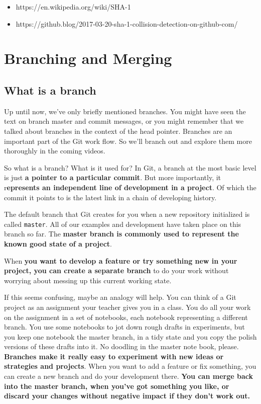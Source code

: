	\begin{itemize}
		\item 	https://en.wikipedia.org/wiki/SHA-1
		\item  	https://github.blog/2017-03-20-sha-1-collision-detection-on-github-com/
	\end{itemize}
	
\section{Branching and Merging}

	\subsection{What is a branch}
	
	Up until now, we've only briefly mentioned branches. You might have seen the text on branch master and commit messages, or you might remember that we talked about branches in the context of the head pointer. Branches are an important part of the Git work flow. So we'll branch out and explore them more thoroughly in the coming videos. 
	
	So what is a branch? What is it used for? In Git, a branch at the most basic level is just \textbf{a pointer to a particular commit}. But more importantly, it r\textbf{epresents an independent line of development in a project}. Of which the commit it points to is the latest link in a chain of developing history. 
	
	The default branch that Git creates for you when a new repository initialized is called \texttt{master}. All of our examples and development have taken place on this branch so far. The\textbf{ master branch is commonly used to represent the known good state of a project}. 
	
	When\textbf{ you want to develop a feature or try something new in your project, you can create a separate branch} to do your work without worrying about messing up this current working state. 
	
	If this seems confusing, maybe an analogy will help. You can think of a Git project as an assignment your teacher gives you in a class. You do all your work on the assignment in a set of notebooks, each notebook representing a different branch. You use some notebooks to jot down rough drafts in experiments, but you keep one notebook the master branch, in a tidy state and you copy the polish versions of these drafts into it. No doodling in the master note book, please. \textbf{Branches make it really easy to experiment with new ideas or strategies and projects}. When you want to add a feature or fix something, you can create a new branch and do your development there. \textbf{You can merge back into the master branch, when you've got something you like, or discard your changes without negative impact if they don't work out.} 
	
